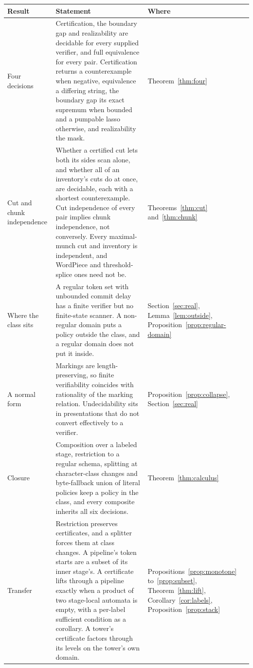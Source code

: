 \documentclass[11pt,a4paper]{article}
\theoremstyle{definition}
\theoremstyle{plain}
\begin{document}
\begin{table}[tp]
\centering \small
\begin{tabular}{L{2.5cm}L{8.8cm}L{3.3cm}}
\toprule Result & Statement & Where \\ \midrule
Four decisions & Certification, the boundary gap and realizability are decidable for every supplied verifier, and full
equivalence for every pair. Certification returns a counterexample when negative, equivalence a differing string, the
boundary gap its exact supremum when bounded and a pumpable lasso otherwise, and realizability the mask. &
Theorem~\ref{thm:four} \\
\addlinespace Cut and chunk independence & Whether a certified cut lets both its sides scan alone, and whether all of
an inventory's cuts do at once, are decidable, each with a shortest counterexample. Cut independence of every pair
implies chunk independence, not conversely. Every maximal-munch cut and inventory is independent, and WordPiece and
threshold-splice ones need not be. & Theorems~\ref{thm:cut} and~\ref{thm:chunk} \\
\addlinespace Where the class sits & A regular token set with unbounded commit delay has a finite verifier but no
finite-state scanner. A non-regular domain puts a policy outside the class, and a regular domain does not put it
inside. & Section~\ref{sec:real}, Lemma~\ref{lem:outside}, Proposition~\ref{prop:regular-domain} \\
\addlinespace A normal form & Markings are length-preserving, so finite verifiability coincides with rationality of
the marking relation. Undecidability sits in presentations that do not convert effectively to a verifier. &
Proposition~\ref{prop:collapse}, Section~\ref{sec:real} \\
\addlinespace Closure & Composition over a labeled stage, restriction to a regular schema, splitting at character-class
changes and byte-fallback union of literal policies keep a policy in the class, and every composite inherits all six
decisions. & Theorem~\ref{thm:calculus} \\
\addlinespace Transfer & Restriction preserves certificates, and a splitter forces them at class changes. A pipeline's
token starts are a subset of its inner stage's. A certificate lifts through a pipeline exactly when a product of two
stage-local automata is empty, with a per-label sufficient condition as a corollary. A tower's certificate factors
through its levels on the tower's own domain. & Propositions~\ref{prop:monotone} to~\ref{prop:subset},
Theorem~\ref{thm:lift}, Corollary~\ref{cor:labels}, Proposition~\ref{prop:stack} \\

\end{tabular}
\end{table}
\end{document}
